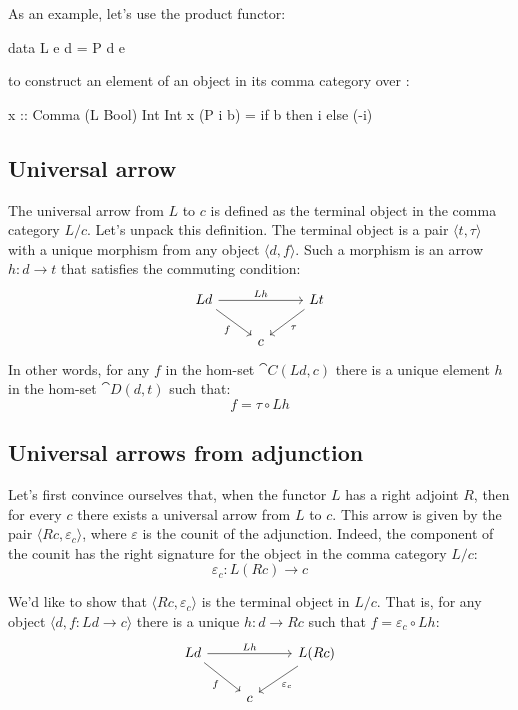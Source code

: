 \documentclass[DaoFP]{subfiles}
\begin{document}
As an example, let's use the product functor:
\begin{haskell}
data L e d = P d e
\end{haskell}
to construct an element of an object in its comma category over :
\begin{haskell}
x :: Comma (L Bool) Int Int 
x (P i b) = if b then i else (-i)
\end{haskell}

\subsection{Universal arrow}

The universal arrow from $L$ to $c$ is defined as the terminal object in the comma category $L / c$. Let's unpack this definition. The terminal object is a pair $\langle t, \tau \rangle$ with a unique morphism from any object $\langle d, f \rangle$. Such a morphism is an arrow $h \colon d \to t$ that satisfies the commuting condition:
\[
 \begin{tikzcd}
 L d
 \arrow[rd, "f"']
 \arrow[rr, "L h"]
 && L t
 \arrow[ld, "\tau"]
 \\
 &c
  \end{tikzcd}
\]
In other words, for any $f$ in the hom-set $\cat C (L d, c)$ there is a unique element $h$ in the hom-set $\cat D (d, t)$ such that:
\[ f = \tau \circ L h \]

\subsection{Universal arrows from adjunction}

Let's first convince ourselves that, when the functor $L$ has a right adjoint $R$, then for every $c$ there exists a universal arrow from $L$ to $c$. This arrow is given by the pair $\langle R c, \varepsilon_c \rangle$, where $\varepsilon$ is the counit of the adjunction. Indeed, the component of the counit has the right signature for the object in the comma category $L/c$:
\[ \varepsilon_c \colon L (R c) \to c \]

We'd like to show that $\langle R c, \varepsilon_c \rangle$ is the terminal object in $L/c$. That is, for any object $\langle d, f \colon L d \to c \rangle$ there is a unique $h \colon d \to R c$ such that $f = \varepsilon_c \circ L h$:
\[
 \begin{tikzcd}
 L d
 \arrow[rd, "f"']
 \arrow[rr, "L h"]
 && L (R c)
 \arrow[ld, "\varepsilon_c"]
 \\
 &c
  \end{tikzcd}
\]
\end{document}
